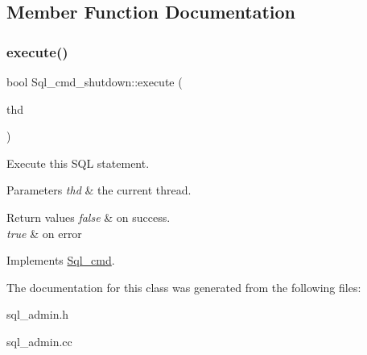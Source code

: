 \subsection{Member Function Documentation}
\mbox{\label{classSql__cmd__shutdown_ae56998e3f20e85707c230561f32a56f3}} 
\subsubsection{\texorpdfstring{execute()}{execute()}}
{\footnotesize\ttfamily bool Sql\+\_\+cmd\+\_\+shutdown\+::execute (\begin{DoxyParamCaption}\item[{T\+HD $\ast$}]{thd }\end{DoxyParamCaption})\hspace{0.3cm}{\ttfamily [virtual]}}

Execute this S\+QL statement. 
\begin{DoxyParams}{Parameters}
{\em thd} & the current thread. \\
\hline
\end{DoxyParams}

\begin{DoxyRetVals}{Return values}
{\em false} & on success. \\
\hline
{\em true} & on error \\
\hline
\end{DoxyRetVals}


Implements \mbox{\hyperlink{classSql__cmd_a213367b79b551296fbb7790f2a3732fb}{Sql\+\_\+cmd}}.



The documentation for this class was generated from the following files\+:\begin{DoxyCompactItemize}
\item 
sql\+\_\+admin.\+h\item 
sql\+\_\+admin.\+cc\end{DoxyCompactItemize}
